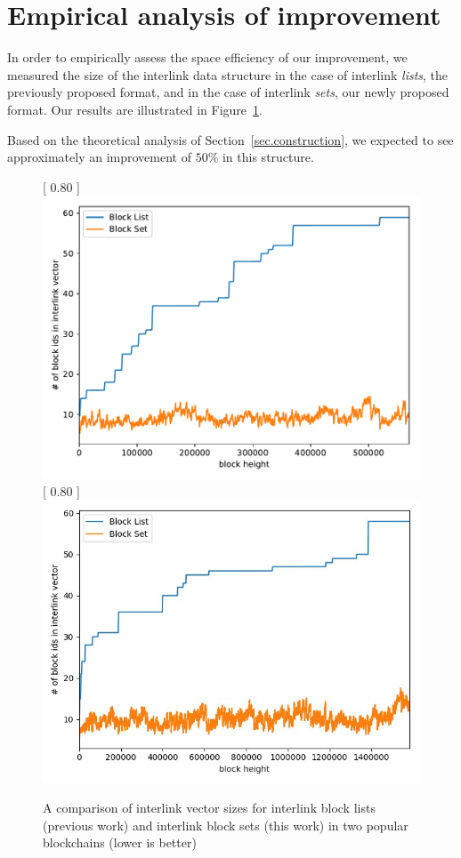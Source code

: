 \section{Empirical analysis of improvement}

In order to empirically assess the space efficiency of our improvement, we
measured the size of the interlink data structure in the case of interlink
\emph{lists}, the previously proposed format, and in the case of interlink
\emph{sets}, our newly proposed format. Our results are illustrated in
Figure~\ref{fig.set-list-vector-comparison}.

Based on the theoretical analysis of Section~\ref{sec.construction}, we expected
to see approximately an improvement of $50\%$ in this structure.

\begin{figure}
   \centering
   [
       0.80\textwidth
   ]
   {
       \includegraphics[width=0.85 \textwidth]
       {figures/interlink-vector-blocklist-vs-blockset.pdf}
   }
   \vskip 0pt
   [
       0.80\textwidth
   ]
   {
       \includegraphics[width=0.85 \textwidth]
       {figures/interlink-vector-blocklist-vs-blockset-litecoin.jpg}
   }
   \caption{A comparison of interlink vector sizes for interlink block lists (previous work) and interlink block sets (this work) in two popular blockchains (lower is better)}
   \label{fig.set-list-vector-comparison}
\end{figure}

